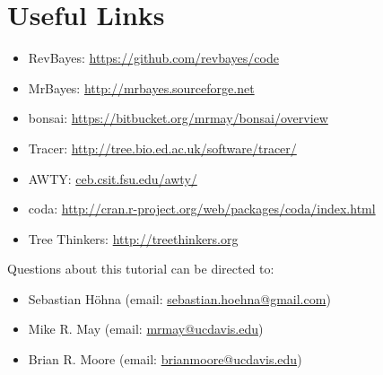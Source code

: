 \documentclass[11pt]{article}
\begin{document}
\bigskip
\section*{Useful Links}

\begin{itemize}
\item RevBayes: \href{https://github.com/revbayes/code}{https://github.com/revbayes/code} \\ \vspace{-7mm}
\item MrBayes: \href{http://mrbayes.sourceforge.net/}{http://mrbayes.sourceforge.net} \\ \vspace{-7mm}
\item bonsai: \href{https://bitbucket.org/mrmay/bonsai/overview}{https://bitbucket.org/mrmay/bonsai/overview} \\  \vspace{-7mm}
\item Tracer: \href{http://tree.bio.ed.ac.uk/software/tracer/}{http://tree.bio.ed.ac.uk/software/tracer/} \\ \vspace{-7mm}
\item AWTY: \href{http://king2.scs.fsu.edu/CEBProjects/awty/awty_start.php}{ceb.csit.fsu.edu/awty/} \\ \vspace{-7mm}
\item coda: \href{http://cran.r-project.org/web/packages/coda/index.html}{http://cran.r-project.org/web/packages/coda/index.html} \\ \vspace{-7mm}
\item Tree Thinkers: \href{http://treethinkers.org/}{http://treethinkers.org} \\ \vspace{-7mm}
\end{itemize}

Questions about this tutorial can be directed to: \\\vspace{-10mm}
\begin{itemize}
\item Sebastian H\"{o}hna (email: \href{mailto:sebastian.hoehna@gmail.com}{sebastian.hoehna@gmail.com}) \\ \vspace{-7mm}
\item Mike R. May (email: \href{mailto:mrmay@ucdavis.edu}{mrmay@ucdavis.edu}) \\ \vspace{-7mm}
\item Brian R. Moore (email: \href{mailto:brianmoore@ucdavis.edu}{brianmoore@ucdavis.edu}) \\\vspace{-8mm}
\end{itemize}
\end{document}

